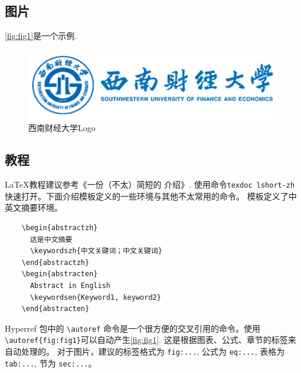   \subsection{图片}
  \autoref{fig:fig1}是一个示例.

  \begin{figure}[htbp]
      \centering
      \includegraphics{swufe-Logo/opaque.png}
      \caption{西南财经大学Logo}
      \label{fig:fig1}
  \end{figure}
  \subsection{教程}
  \LaTeX 教程建议参考《一份（不太）简短的 \LaTeXe 介绍》. 使用命令\verb"texdoc lshort-zh" 快速打开。下面介绍模板定义的一些环境与其他不太常用的命令。  
  模板定义了中英文摘要环境。
  \begin{verbatim}
    \begin{abstractzh}
      这是中文摘要
      \keywordszh{中文关键词；中文关键词}
    \end{abstractzh}
    \begin{abstracten}
      Abstract in English
      \keywordsen{Keyword1, keyword2}
    \end{abstracten}
  \end{verbatim}
Hyperref 包中的 \verb"\autoref" 命令是一个很方便的交叉引用的命令。使用 \verb"\autoref{fig:fig1}"可以自动产生\autoref{fig:fig1}. 这是根据图表、公式、章节的标签来自动处理的。 对于图片，建议的标签格式为 \verb"fig:...", 公式为 \verb"eq:...", 表格为 \verb"tab:...", 节为 \verb"sec:..."。
  
